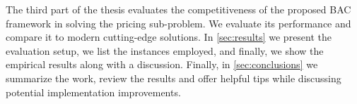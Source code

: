 The third part of the thesis evaluates the competitiveness of the proposed BAC framework
in solving the pricing sub-problem.
We evaluate its performance and compare it to modern cutting-edge solutions.
In \cref{sec:results} we present the evaluation setup, we list the instances employed,
and finally, we show the empirical results along with a discussion.
Finally, in \cref{sec:conclusions} we summarize the work, review the results
and offer helpful tips while discussing potential implementation improvements.
